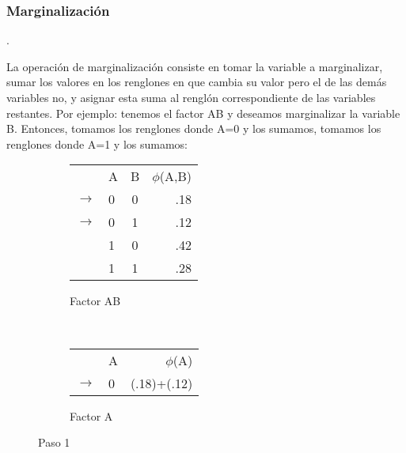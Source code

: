 
\subsubsection{Marginalización}
 \parencite[297]{KollerFriedman2009}.

La operación de marginalización consiste en tomar la variable a marginalizar, sumar los valores en los renglones en que cambia su valor pero el de las demás variables no, y asignar esta suma al renglón correspondiente de las variables restantes. Por ejemplo: tenemos el factor AB y deseamos marginalizar la variable B. Entonces, tomamos los renglones donde A=0 y los sumamos, tomamos los renglones donde A=1 y los sumamos:

\begin{figure}[H]
    \centering
    \begin{subfigure}[b]{0.4\textwidth}
        \centering
        \begin{tabular}{ l l  c | r }
           & A & B & $\phi$(A,B)\\ \cline{2-4}
          \(\to\) & 0 & 0 & .18  \\ \cline{2-4}
          \(\to\) & 0 & 1 & .12  \\ \cline{2-4}
           & 1 & 0 & .42  \\ \cline{2-4}
           & 1 & 1 & .28  \\
        \end{tabular}
        \caption{Factor AB}
    \end{subfigure}
    ~ 
    \begin{subfigure}[b]{0.4\textwidth}
        \centering
        \begin{tabular}{l  l | r }
            & A & $\phi$(A)\\ \cline{2-3}
        \(\to\) & 0 & (.18)+(.12)  \\
        \end{tabular}
        \caption{Factor A}
    \end{subfigure}
    \caption{Paso 1}
\end{figure}


